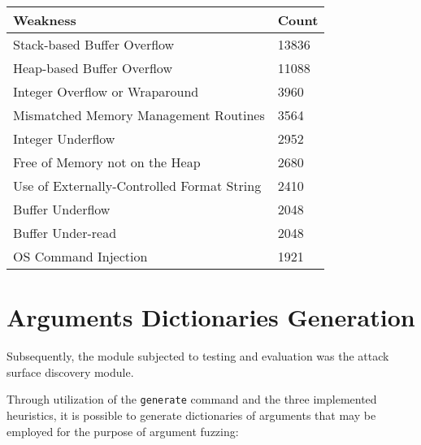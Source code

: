 \documentclass[../main.tex]{subfiles}
\begin{document}
\begin{table}[]
\begin{tabular}{|l|l|}
\hline
Weakness                                   & Count \\ \hline
Stack-based Buffer Overflow                & 13836 \\ \hline
Heap-based Buffer Overflow                 & 11088 \\ \hline
Integer Overflow or Wraparound             & 3960  \\ \hline
Mismatched Memory Management Routines      & 3564  \\ \hline
Integer Underflow                          & 2952  \\ \hline
Free of Memory not on the Heap             & 2680  \\ \hline
Use of Externally-Controlled Format String & 2410  \\ \hline
Buffer Underflow                           & 2048  \\ \hline
Buffer Under-read                          & 2048  \\ \hline
OS Command Injection                       & 1921  \\ \hline
\end{tabular}
\end{table}

\hypertarget{arguments-dictionaries-generation}{%
  \section{Arguments Dictionaries
    Generation}\label{arguments-dictionaries-generation}}

Subsequently, the module subjected to testing and evaluation was the attack
surface discovery module.

Through utilization of the \texttt{generate} command and the three implemented
heuristics, it is possible to generate dictionaries of arguments that may be
employed for the purpose of argument fuzzing:
\end{document}
